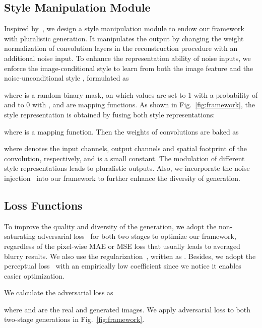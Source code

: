 \documentclass[10pt,twocolumn,letterpaper]{article}
\begin{document}
	
	\subsection{Style Manipulation Module} 
	Inspired by~\cite{chen2018self,karras2019style,karras2020analyzing}, we design a style manipulation module to endow our framework with pluralistic generation. It manipulates the output by changing the weight normalization of convolution layers in the reconstruction procedure with an additional noise input.
	To enhance the representation ability of noise inputs, we enforce the image-conditional style  to learn from both the image feature  and the noise-unconditional style , formulated as
	
	where  is a random binary mask, on which values are set to 1 with a probability of  and to 0 with ,  and  are mapping functions. As shown in Fig.~\ref{fig:framework}, the style representation is obtained by fusing both style representations:
	\vspace{-0.1in}
	
	where  is a mapping function.
	Then the weights  of convolutions are baked as
	
	where  denotes the input channels, output channels and spatial footprint of the convolution, respectively, and  is a small constant. The modulation of different style representations leads to pluralistic outputs. Also, we incorporate the noise injection~\cite{karras2019style} into our framework to further enhance the diversity of generation.
	
	\subsection{Loss Functions}
	\label{sec:lf}
	To improve the quality and diversity of the generation, we adopt the non-saturating adversarial loss~\cite{goodfellow2014generative} for both two stages to optimize our framework, regardless of the pixel-wise MAE or MSE loss that usually leads to averaged blurry results. We also use the  regularization~\cite{mescheder2018training,ross2018improving}, written as . Besides, we adopt the perceptual loss~\cite{johnson2016perceptual} with an empirically low coefficient since we notice it enables easier optimization.
	
	\vspace{0.08in}
	We calculate the adversarial loss as
	
	where  and  are the real and generated images. We apply adversarial loss to both two-stage generations in Fig.~\ref{fig:framework}.
	
\end{document}
